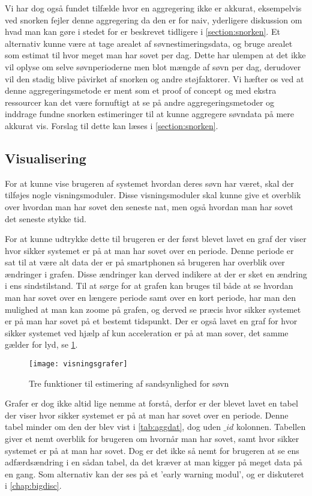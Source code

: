 Vi har dog også fundet tilfælde hvor en aggregering ikke er akkurat, eksempelvis ved snorken fejler denne aggregering da den er for naiv, yderligere diskussion om hvad man kan gøre i stedet for er beskrevet tidligere i \cref{section:snorken}.
Et alternativ kunne være at tage arealet af søvnestimeringsdata, og bruge arealet som estimat til hvor meget man har sovet per dag.
Dette har ulempen at det ikke vil oplyse om selve søvnperioderne men blot mængde af søvn per dag, derudover vil den stadig blive påvirket af snorken og andre støjfaktorer.
Vi hæfter os ved at denne aggregeringsmetode er ment som et proof of concept og med ekstra ressourcer kan det være fornuftigt at se på andre aggregeringsmetoder og inddrage fundne snorken estimeringer til at kunne aggregere søvndata på mere akkurat vis. Forslag til dette kan læses i \cref{section:snorken}.

\subsection{Visualisering}\label{sec:pocVis}
For at kunne vise brugeren af systemet hvordan deres søvn har været, skal der tilføjes nogle visningsmoduler.
Disse visningsmoduler skal kunne give et overblik over hvordan man har sovet den seneste nat, men også hvordan man har sovet det seneste stykke tid.

For at kunne udtrykke dette til brugeren er der først blevet lavet en graf der viser hvor sikker systemet er på at man har sovet over en periode.
Denne periode er sat til at være alt data der er på smartphonen så brugeren har overblik over ændringer i grafen.
Disse ændringer kan derved indikere at der er sket en ændring i ens sindstilstand.
Til at sørge for at grafen kan bruges til både at se hvordan man har sovet over en længere periode samt over en kort periode, har man den mulighed at man kan zoome på grafen, og derved se præcis hvor sikker systemet er på man har sovet på et bestemt tidspunkt.
Der er også lavet en graf for hvor sikker systemet ved hjælp af kun acceleration er på at man sover, det samme gælder for lyd, se \cref{fig:visningsgrafer}.

\begin{figure}[h]
	\centering
	\texttt{[image: visningsgrafer]}
	\caption{Tre funktioner til estimering af sandsynlighed for søvn}\label{fig:visningsgrafer}
\end{figure}

Grafer er dog ikke altid lige nemme at forstå, derfor er der blevet lavet en tabel der viser hvor sikker systemet er på at man har sovet over en periode.
Denne tabel minder om den der blev vist i \cref{tab:aggdat}, dog uden $\_id$ kolonnen.
Tabellen giver et nemt overblik for brugeren om hvornår man har sovet, samt hvor sikker systemet er på at man har sovet.
Dog er det ikke så nemt for brugeren at se ens adfærdsændring i en sådan tabel, da det kræver at man kigger på meget data på en gang.
Som alternativ kan der ses på et 'early warning modul', og er diskuteret i \cref{chap:bigdisc}.
